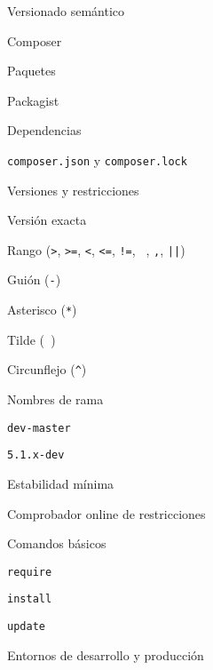 \begin{longenum}
    \begin{longenum}
        \item Versionado semántico
        \item Composer
        \begin{longenum}
            \item Paquetes
            \item Packagist
            \item Dependencias
            \begin{longenum}
                \item \texttt{composer.json} y \texttt{composer.lock}
            \end{longenum}
            \item Versiones y restricciones
            \begin{longenum}
                \item Versión exacta
                \item Rango (\texttt{>}, \texttt{>=}, \texttt{<}, \texttt{<=}, \texttt{!=}, \texttt{ }, \texttt{,}, \texttt{||})
                \item Guión (\texttt{-})
                \item Asterisco (\texttt{*})
                \item Tilde (\texttt{~})
                \item Circunflejo (\texttt{\^})
                \item Nombres de rama
                \begin{longenum}
                    \item \texttt{dev-master}
                    \item \texttt{5.1.x-dev}
                \end{longenum}
                \item Estabilidad mínima
                \item Comprobador online de restricciones
            \end{longenum}
            \item Comandos básicos
            \begin{longenum}
                \item \texttt{require}
                \item \texttt{install}
                \item \texttt{update}
            \end{longenum}
            \item Entornos de desarrollo y producción

\end{longenum}
\end{longenum}
\end{longenum}
